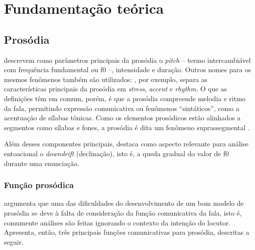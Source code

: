 
\chapter{Fundamentação teórica}

\section{Prosódia}
 descrevem como parâmetros principais da prosódia o
\emph{pitch} -- termo intercambiável com frequência fundamental ou f0 --,
intensidade e duração. Outros nomes para os mesmos fenômenos também são
utilizados: , por exemplo, separa as características
principais da prosódia em \emph{stress}, \emph{accent} e \emph{rhythm}. O que as
definições têm em comum, porém, é que a prosódia compreende melodia e ritmo da
fala, permitindo expressão comunicativa ou fenômenos ``sintáticos'', como a
acentuação de sílabas tônicas. Como os elementos prosódicos estão alinhados a segmentos como sílabas e fones, a prosódia é dita um fenômeno suprassegmental \cite{ladd}.

Além desses componentes principais, 
destaca como aspecto relevante para análise entoacional o \emph{downdrift}
(declinação), isto é, a queda gradual do valor de f0 durante uma enunciação.


\subsection{Função prosódica}
 argumenta que uma das dificuldades do desenvolvimento de
um bom modelo de prosódia se deve à falta de consideração da função
comunicativa da fala, isto é, comumente análises são feitas ignorando o contexto
da intenção do locutor. Apresenta, então, três principais funções comunicativas
para prosódia, descritas a seguir.

